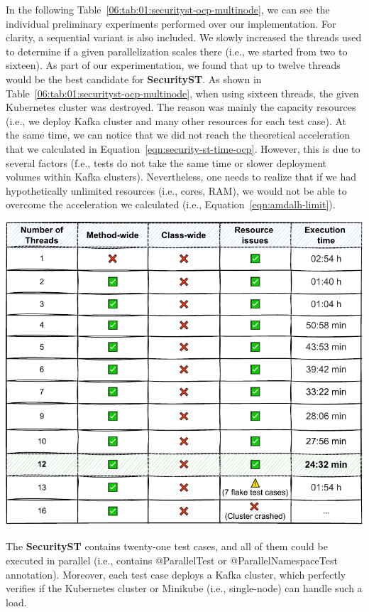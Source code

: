 In the following Table~\ref{06:tab:01:securityst-ocp-multinode}, we can see the individual preliminary experiments performed over our implementation.
For clarity, a sequential variant is also included.
We slowly increased the threads used to determine if a given parallelization scales there (i.e., we started from two to sixteen).
As part of our experimentation, we found that up to twelve threads would be the best candidate for \textbf{SecurityST}.
As shown in Table~\ref{06:tab:01:securityst-ocp-multinode}, when using sixteen threads, the given Kubernetes cluster was destroyed.
The reason was mainly the capacity resources (i.e., we deploy Kafka cluster and many other resources for each test case).
At the same time, we can notice that we did not reach the theoretical acceleration that we calculated in Equation~\eqref{eqn:security-st-time-ocp}.
However, this is due to several factors (f.e., tests do not take the same time or slower deployment volumes within Kafka clusters).
Nevertheless, one needs to realize that if we had hypothetically unlimited resources (i.e., cores, RAM), we would not be able to overcome
the acceleration we calculated (i.e., Equation~\eqref{eqn:amdalh-limit}).
\begin{table}[ht!]
    \centering
    \includegraphics[scale=0.8]{obrazky-figures/08-experiments/06-exp-final-smoke-method-wide-ocp}
    \caption{The \textbf{SecurityST} contains twenty-one test cases, and all of them could be executed in parallel
        (i.e., contains @ParallelTest or @ParallelNamespaceTest annotation).
        Moreover, each test case deploys a Kafka cluster, which perfectly verifies if the Kubernetes cluster
        or Minikube (i.e., single-node) can handle such a load.}
    \label{06:tab:01:securityst-ocp-multinode}
\end{table}

